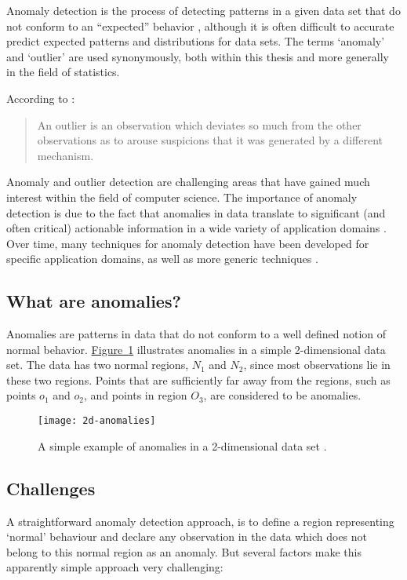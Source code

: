 Anomaly detection is the process of detecting patterns in a given data set that 
do not conform to an ``expected'' behavior \cite{Chandola:2007}, although it is
often difficult to accurate predict expected patterns and distributions for data
sets. The terms `anomaly' and `outlier' are used synonymously, both within this 
thesis and more generally in the field of statistics.

According to \citeauthor{Hawkins:1980} \cite{Hawkins:1980}:
\begin{quote}
An outlier is an observation which deviates so much from the other observations 
as to arouse suspicions that it was generated by a different mechanism.
\end{quote}

Anomaly and outlier detection are challenging areas that have gained much 
interest within the field of computer science. The importance of anomaly 
detection is due to the fact that anomalies in data translate to significant 
(and often critical) actionable information in a wide variety of application 
domains \cite{Chandola:2007}. Over time, many techniques for anomaly 
detection have been developed for specific application domains, as well as more 
generic techniques \cite{Chandola:2007}.

\subsection{What are anomalies?}
\label{sec:whatAreAnomalies}
Anomalies are patterns in data that do not conform to a well defined notion of
normal behavior. \hyperref[fig:2d-anomalies]{Figure~\ref{fig:2d-anomalies}} 
illustrates anomalies in a simple 2-dimensional data set. The data has two 
normal regions, $N_{1}$ and $N_{2}$, since most observations lie in these two 
regions. Points that are sufficiently far away from the regions, such as points 
$o_{1}$ and $o_{2}$, and points in region $O_{3}$, are considered to be 
anomalies.

\begin{figure}
\centering
\texttt{[image: 2d-anomalies]}
\caption[A simple example of anomalies in a 2-dimensional data set.]{A simple 
example of anomalies in a 2-dimensional data set \cite{Chandola:2007}.}
\label{fig:2d-anomalies}
\end{figure}

\subsection{Challenges}
\label{sec:anomalyDetectionChallenges}
A straightforward anomaly detection approach, is to define a region representing
`normal' behaviour and declare any observation in the data which does not belong
to this normal region as an anomaly. But several factors make this apparently 
simple approach very challenging:

